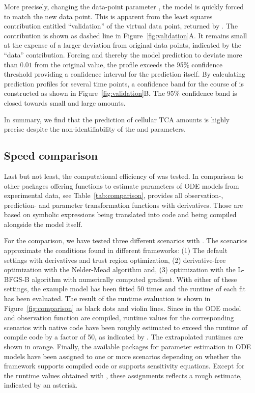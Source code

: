 \documentclass[article]{jss}
\begin{document}
More precisely, changing the data-point parameter , the model is quickly forced to
match the new data point. This is apparent from the least squares contribution entitled ``validation'' of the virtual data point, returned by . 
The contribution is shown as dashed line in Figure~\ref{fig:validation}A. It remains small at the expense of a larger deviation from original data points, indicated by the ``data'' contribution. 
Forcing  and thereby the model
prediction to deviate more than $0.01$ from the original value, the profile
exceeds the 95\% confidence threshold providing a confidence interval for the
prediction itself. By calculating
prediction profiles for several time points, a confidence band for the course of
 is constructed as shown in Figure~\ref{fig:validation}B. The
95\% confidence band is closed towards small and large amounts.

In summary, we find that the prediction of cellular TCA amounts is highly
precise despite the non-identifiability of the  and
 parameters.

\subsection{Speed comparison}

Last but not least, the computational efficiency of  was tested. In comparison to other  packages offering functions to estimate parameters of ODE models from experimental data, see Table~\ref{tab:comparison},  provides all observation-, prediction- and parameter transformation functions with derivatives. Those are based on symbolic expressions being translated into  code and being compiled alongside the model itself.

For the comparison, we have tested three different scenarios with . The scenarios approximate the conditions found in different frameworks: (1) The default settings with derivatives and trust region optimization, (2) derivative-free optimization with the Nelder-Mead algorithm and, (3) optimization with the L-BFGS-B algorithm with numerically computed gradient. With either of these settings, the example model has been fitted 50 times and the runtime of each fit has been evaluated. The result of the runtime evaluation is shown in Figure~\ref{fig:comparison} as black dots and violin lines. Since in  the ODE model and observation function are compiled, runtime values for the corresponding scenarios with native  code have been roughly estimated to exceed the runtime of compile code by a factor of 50, as indicated by \cite{deSolve}. The extrapolated runtimes are shown in orange. Finally, the available packages for parameter estimation in ODE models have been assigned to one or more scenarios depending on whether the framework supports compiled code or supports sensitivity equations. Except for the runtime values obtained with , these assignments reflects a rough estimate, indicated by an asterisk.  
\end{document}
